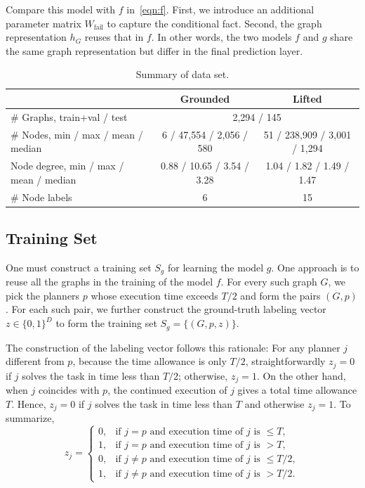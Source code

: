 \documentclass[letterpaper]{article} %
\begin{document}
Compare this model with $f$ in~\eqref{eqn:f}. First, we introduce an additional parameter matrix $W_{\text{fail}}$ to capture the conditional fact. Second, the graph representation $h_G$ reuses that in $f$. In other words, the two models $f$ and $g$ share the same graph representation but differ in the final prediction layer.

\begin{table}[ht]
\centering
\caption{Summary of data set.}
\label{tab:data.set}
\begin{tabular}{lcc}
\hline
& Grounded & Lifted   \\
\hline
\# Graphs, train+val / test & \multicolumn{2}{c}{2,294 / 145}\\
\# Nodes, min / max / mean / median & 6 / 47,554 / 2,056 / 580 & 51 / 238,909 / 3,001 / 1,294 \\
Node degree, min / max / mean / median & 0.88 / 10.65 / 3.54 / 3.28 & 1.04 / 1.82 / 1.49 / 1.47 \\
\# Node labels & 6 & 15 \\
\hline
\end{tabular}
\end{table}


\subsection{Training Set}
One must construct a training set $S_g$ for learning the model $g$. One approach is to reuse all the graphs in the training of the model $f$. For every such graph $G$, we pick the planners $p$ whose execution time exceeds $T/2$ and form the pairs $(G,p)$. For each such pair, we further construct the ground-truth labeling vector $z\in\{0,1\}^D$ to form the training set $S_g=\{(G,p,z)\}$.

The construction of the labeling vector follows this rationale: For any planner $j$ different from $p$, because the time allowance is only $T/2$, straightforwardly $z_j=0$ if $j$ solves the task in time less than $T/2$; otherwise, $z_j=1$. On the other hand, when $j$ coincides with $p$, the continued execution of $j$ gives a total time allowance $T$. Hence, $z_j=0$ if $j$ solves the task in time less than $T$ and otherwise $z_j=1$. To summarize,
\[
z_j=
\begin{cases}
0, & \text{if $j=p$ and execution time of $j$ is $\le T$}, \\
1, & \text{if $j=p$ and execution time of $j$ is $>T$}, \\
0, & \text{if $j\ne p$ and execution time of $j$ is $\le T/2$}, \\
1, & \text{if $j\ne p$ and execution time of $j$ is $>T/2$}.
\end{cases}
\]
\end{document}
